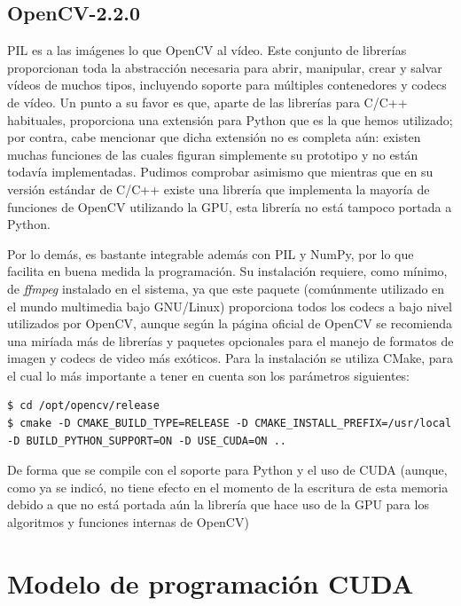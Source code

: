 \documentclass[twoside]{article}
\begin{document}
\subsection{OpenCV-2.2.0}

PIL es a las imágenes lo que OpenCV al vídeo. Este conjunto de librerías proporcionan toda la abstracción necesaria para abrir, manipular, crear y salvar vídeos de muchos tipos, incluyendo soporte para múltiples contenedores y codecs de vídeo. Un punto a su favor es que, aparte de las librerías para C/C++ habituales, proporciona una extensión para Python que es la que hemos utilizado; por contra, cabe mencionar que dicha extensión no es completa aún: existen muchas funciones de las cuales figuran simplemente su prototipo y no están todavía implementadas. Pudimos comprobar asimismo que mientras que en su versión estándar de C/C++ existe una librería que implementa la mayoría de funciones de OpenCV utilizando la GPU, esta librería no está tampoco portada a Python.

\vspace{5 mm}

Por lo demás, es bastante integrable además con PIL y NumPy, por lo que facilita en buena medida la programación. Su instalación requiere, como mínimo, de \emph{ffmpeg} instalado en el sistema, ya que este paquete (comúnmente utilizado en el mundo multimedia bajo GNU/Linux) proporciona todos los codecs a bajo nivel utilizados por OpenCV, aunque según la página oficial de OpenCV se recomienda una miríada más de librerías y paquetes opcionales para el manejo de formatos de imagen y codecs de video más exóticos. Para la instalación se utiliza CMake, para el cual lo más importante a tener en cuenta son los parámetros siguientes:

\begin{verbatim}
$ cd /opt/opencv/release
$ cmake -D CMAKE_BUILD_TYPE=RELEASE -D CMAKE_INSTALL_PREFIX=/usr/local -D BUILD_PYTHON_SUPPORT=ON -D USE_CUDA=ON ..
\end{verbatim}

De forma que se compile con el soporte para Python y el uso de CUDA (aunque, como ya se indicó, no tiene efecto en el momento de la escritura de esta memoria debido a que no está portada aún la librería que hace uso de la GPU para los algoritmos y funciones internas de OpenCV)


\section{Modelo de programación CUDA}
\end{document}
